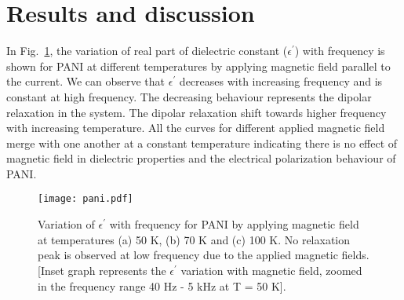 \documentclass[journal=jaccck,manuscript=article]{achemso}
\begin{document}
\section{Results and discussion}


In Fig.~\ref{fig: pani}, the variation of real part of dielectric constant ($\epsilon^\prime$) with frequency is shown for PANI at different temperatures by applying magnetic field parallel to the current. We can observe that $\epsilon^\prime$ decreases with increasing frequency and is constant at high frequency. The decreasing behaviour represents the dipolar relaxation in the system. The dipolar relaxation shift towards higher frequency with increasing temperature. All the curves for different applied magnetic field merge with one another at a constant temperature indicating there is no effect of magnetic field in dielectric properties and the electrical polarization behaviour of PANI.
\begin{figure}[tbh!]
	\begin{center}
		\texttt{[image: pani.pdf]}
		\small{\caption{ Variation of $\epsilon^\prime$ with frequency for PANI by applying magnetic field at temperatures (a) 50 K, (b) 70 K and (c) 100 K. No relaxation peak is observed at low frequency due to the applied magnetic fields. [Inset graph represents the $\epsilon^\prime$ variation with magnetic field, zoomed in the frequency range 40 Hz - 5 kHz at T = 50 K].  \label{fig: pani}}}
	\end{center}
\end{figure}
\end{document}
